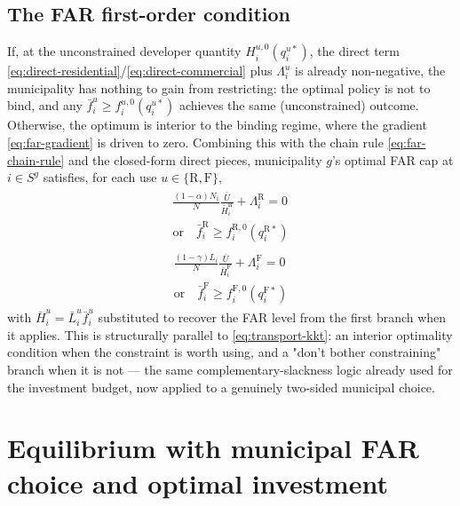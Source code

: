 \documentclass[12pt,a4paper]{article}
\newcommand{\R}{\mathrm{R}}
\newcommand{\F}{\mathrm{F}}
\newcommand{\1}{\mathbb 1}
\begin{document}
\subsection{The FAR first-order condition}

If, at the unconstrained developer quantity $H_i^{u,0}(q_i^{u*})$, the direct term \eqref{eq:direct-residential}/\eqref{eq:direct-commercial} plus $\Lambda_i^u$ is already non-negative, the municipality has nothing to gain from restricting: the optimal policy is not to bind, and any $\bar f_i^u\geq f_i^{u,0}(q_i^{u*})$ achieves the same (unconstrained) outcome. Otherwise, the optimum is interior to the binding regime, where the gradient \eqref{eq:far-gradient} is driven to zero. Combining this with the chain rule \eqref{eq:far-chain-rule} and the closed-form direct pieces, municipality $g$'s optimal FAR cap at $i\in S^g$ satisfies, for each use $u\in\{\R,\F\}$,
\begin{align}
\boxed{
\begin{gathered}
\frac{(1-\alpha)N_i}{N}\frac{\bar U}{\bar H_i^{\R}}+\Lambda_i^{\R}=0\\
\text{or}\quad
\bar f_i^{\R}\geq f_i^{\R,0}(q_i^{\R*})
\end{gathered}
}
\label{eq:far-foc}
\end{align}
\begin{align}
\boxed{
\begin{gathered}
\frac{(1-\gamma)L_i}{N}\frac{\bar U}{\bar H_i^{\F}}+\Lambda_i^{\F}=0\\
\text{or}\quad
\bar f_i^{\F}\geq f_i^{\F,0}(q_i^{\F*})
\end{gathered}
}
\label{eq:far-foc-commercial}
\end{align}
with $\bar H_i^u=\bar L_i^u\bar f_i^u$ substituted to recover the FAR level from the first branch when it applies. This is structurally parallel to \eqref{eq:transport-kkt}: an interior optimality condition when the constraint is worth using, and a "don't bother constraining" branch when it is not — the same complementary-slackness logic already used for the investment budget, now applied to a genuinely two-sided municipal choice.

\section{Equilibrium with municipal FAR choice and optimal investment}
\end{document}
